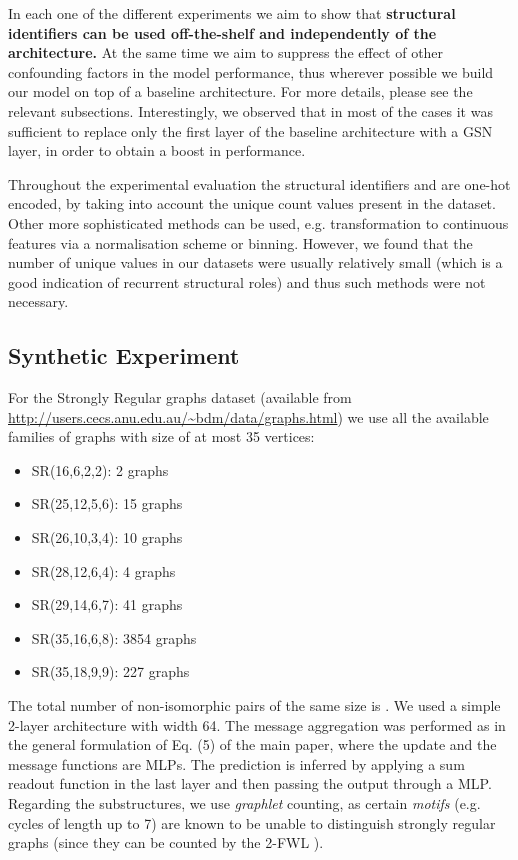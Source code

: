 In each one of the different experiments we aim to show that \textbf{structural identifiers can be used off-the-shelf and independently of the architecture.} At the same time we aim to suppress the effect of other confounding factors in the model performance, thus wherever possible we build our model on top of a baseline architecture. For more details, please see the relevant subsections. Interestingly, we observed that in most of the cases it was sufficient to replace only the first layer of the baseline architecture with a GSN layer, in order to obtain a boost in performance.

Throughout the experimental evaluation the structural identifiers  and  are one-hot encoded, by taking into account the unique count values present in the dataset. Other more sophisticated methods can be used, e.g. transformation to continuous features via a normalisation scheme or binning. However, we found that the number of unique values in our datasets were usually relatively small (which is a good indication of recurrent structural roles) and thus such methods were not necessary.



\subsection{Synthetic Experiment}

For the Strongly Regular graphs dataset (available from \url{http://users.cecs.anu.edu.au/~bdm/data/graphs.html}) we use all the available families of graphs with size of at most 35 vertices: 

\begin{itemize}
    \item SR(16,6,2,2): 2 graphs
    \item SR(25,12,5,6): 15 graphs
    \item SR(26,10,3,4): 10 graphs
    \item SR(28,12,6,4): 4 graphs
    \item SR(29,14,6,7): 41 graphs
    \item SR(35,16,6,8): 3854 graphs
    \item SR(35,18,9,9): 227 graphs
\end{itemize}

The total number of non-isomorphic pairs of the same size is . We used a simple 2-layer architecture with width 64. The message aggregation was performed as in the general formulation of Eq. (5) of the main paper, where the update and the message functions are MLPs. The prediction is inferred by applying a sum readout function in the last layer and then passing the output through a MLP. Regarding the substructures, we use \textit{graphlet} counting, as certain \textit{motifs} (e.g. cycles of length up to 7) are known to be unable to distinguish strongly regular graphs (since they can be counted by the 2-FWL \cite{furer2017combinatorial, DBLP:conf/fct/ArvindFKV19}).

